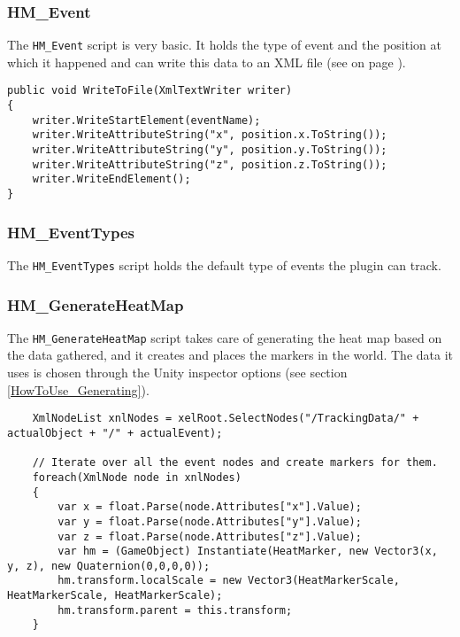 \subsubsection*{HM\_Event}

The \texttt{HM\_Event} script is very basic. It holds the type of event and the position at which it happened and can write this data to an XML file (see  on page \pageref{code:OFS_01}).

\begin{lstlisting}
public void WriteToFile(XmlTextWriter writer)
{
	writer.WriteStartElement(eventName);
	writer.WriteAttributeString("x", position.x.ToString());
	writer.WriteAttributeString("y", position.y.ToString());
	writer.WriteAttributeString("z", position.z.ToString());
	writer.WriteEndElement();
}
\end{lstlisting}

\subsubsection*{HM\_EventTypes}

The \texttt{HM\_EventTypes} script holds the default type of events the plugin can track.

\subsubsection*{HM\_GenerateHeatMap}

The \texttt{HM\_GenerateHeatMap} script takes care of generating the heat map based on the data gathered, and it creates and places the markers in the world. The data it uses is chosen through the Unity inspector options (see section \ref{HowToUse_Generating}).

\begin{lstlisting}
	XmlNodeList xnlNodes = xelRoot.SelectNodes("/TrackingData/" + actualObject + "/" + actualEvent);
	
	// Iterate over all the event nodes and create markers for them.
	foreach(XmlNode node in xnlNodes)
	{
		var x = float.Parse(node.Attributes["x"].Value);
		var y = float.Parse(node.Attributes["y"].Value);
		var z = float.Parse(node.Attributes["z"].Value);
		var hm = (GameObject) Instantiate(HeatMarker, new Vector3(x, y, z), new Quaternion(0,0,0,0));
		hm.transform.localScale = new Vector3(HeatMarkerScale, HeatMarkerScale, HeatMarkerScale);
		hm.transform.parent = this.transform;
	}
\end{lstlisting}

